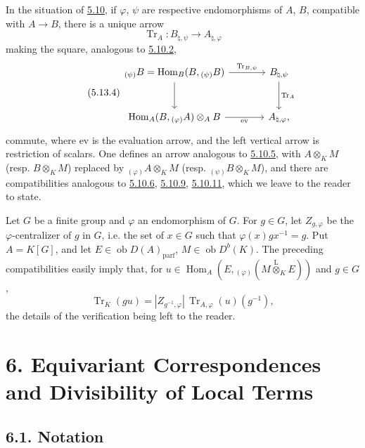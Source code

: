 \documentclass[11pt]{article}
\DeclareMathOperator{\Hom}{Hom}
\newcommand{\ob}{\operatorname{ob}}
\providecommand{\Tr}{\operatorname{Tr}}
\providecommand{\Tr}{\operatorname{Tr}}
\providecommand{\lten}{\overset{\mathrm L}{\otimes}}
\providecommand{\Tr}{\operatorname{Tr}}
\providecommand{\Hom}{\operatorname{Hom}}
\providecommand{\ob}{\operatorname{ob}}
\providecommand{\lten}{\overset{\mathrm L}{\otimes}}
\providecommand{\lten}{\overset{\mathrm L}{\otimes}}
\providecommand{\Tr}{\operatorname{Tr}}
\providecommand{\lten}{\overset{\mathrm L}{\otimes}}
\providecommand{\lten}{\overset{\mathrm L}{\otimes}}
\providecommand{\lten}{\overset{\mathrm L}{\otimes}}
\providecommand{\Hom}{\operatorname{Hom}}
\providecommand{\Tr}{\operatorname{Tr}}
\providecommand{\lten}{\overset{\mathrm L}{\otimes}}
\begin{document}
In the situation of \hyperref[sga5:IIIB:subsubsection:5.10]{5.10}, if $\varphi$, $\psi$ are respective endomorphisms of $A$, $B$, compatible with $A\to B$, there is a unique arrow
\[
\Tr_A:B_{\natural,\psi}\longrightarrow A_{\natural,\varphi}
\]
making the square, analogous to \hyperref[sga5:IIIB:equation:5.10.2]{5.10.2},
\begin{equation}\tag{5.13.4}\label{sga5:IIIB:equation:5.13.4}
\begin{tikzcd}[column sep=large,row sep=large]
{}_{(\psi)}B=\Hom_B(B,{}_{(\psi)}B) \arrow[r,"\Tr_{B,\psi}"] \arrow[d] & B_{\natural,\psi} \arrow[d,"\Tr_A"]\\
\Hom_A(B,{}_{(\varphi)}A)\otimes_AB \arrow[r,"\mathrm{ev}"'] & A_{\natural,\varphi},
\end{tikzcd}
\end{equation}
commute, where $\mathrm{ev}$ is the evaluation arrow, and the left vertical arrow is restriction of scalars. One defines an arrow analogous to \hyperref[sga5:IIIB:equation:5.10.5]{5.10.5}, with $A\otimes_KM$ (resp. $B\otimes_KM$) replaced by ${}_{(\varphi)}A\otimes_KM$ (resp. ${}_{(\psi)}B\otimes_KM$), and there are compatibilities analogous to \hyperref[sga5:IIIB:proposition:5.10.6]{5.10.6}, \hyperref[sga5:IIIB:proposition:5.10.9]{5.10.9}, \hyperref[sga5:IIIB:corollary:5.10.11]{5.10.11}, which we leave to the reader to state.

Let $G$ be a finite group and $\varphi$ an endomorphism of $G$. For $g\in G$, let $Z_{g,\varphi}$ be the $\varphi$-centralizer of $g$ in $G$, i.e. the set of $x\in G$ such that $\varphi(x)gx^{-1}=g$. Put $A=K[G]$, and let $E\in\ob D(A)_{\mathrm{parf}}$, $M\in\ob D^b(K)$. The preceding compatibilities easily imply that, for $u\in\Hom_A(E,{}_{(\varphi)}(M\lten_KE))$ and $g\in G$,
\begin{equation}\tag{5.13.5}\label{sga5:IIIB:equation:5.13.5}
\Tr_K(gu)=|Z_{g^{-1},\varphi}|\,\Tr_{A,\varphi}(u)(g^{-1}),
\end{equation}
the details of the verification being left to the reader.

\section*{6. Equivariant Correspondences and Divisibility of Local Terms}\label{sga5:IIIB:section:6}

\subsection*{6.1. Notation}\label{sga5:IIIB:subsection:6.1}
\end{document}
